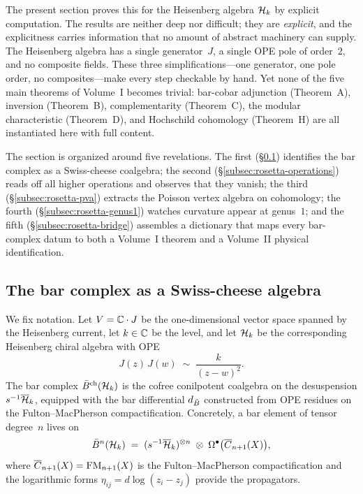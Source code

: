 The present section proves this for the Heisenberg algebra
$\mathcal{H}_k$ by explicit computation.  The results are neither deep
nor difficult; they are \emph{explicit}, and the explicitness
carries information that no amount of abstract machinery can supply.
The Heisenberg algebra has a single generator~$J$, a single
OPE pole of order~$2$, and no composite fields.  These three
simplifications---one generator, one pole order, no composites---make
every step checkable by hand.  Yet none of the five main theorems
of Volume~I becomes trivial: bar-cobar adjunction (Theorem~A),
inversion (Theorem~B), complementarity (Theorem~C), the modular
characteristic (Theorem~D), and Hochschild cohomology (Theorem~H)
are all instantiated here with full content.

The section is organized around five revelations.  The first
(\S\ref{subsec:rosetta-swiss-cheese}) identifies the bar complex
as a Swiss-cheese coalgebra; the second
(\S\ref{subsec:rosetta-operations}) reads off all higher operations
and observes that they vanish; the third
(\S\ref{subsec:rosetta-pva}) extracts the Poisson vertex algebra
on cohomology; the fourth (\S\ref{subsec:rosetta-genus1}) watches
curvature appear at genus~$1$; and the fifth
(\S\ref{subsec:rosetta-bridge}) assembles a dictionary that
maps every bar-complex datum to both a Volume~I theorem and a
Volume~II physical identification.


\subsection{The bar complex as a Swiss-cheese algebra}
\label{subsec:rosetta-swiss-cheese}

We fix notation.  Let $V = \mathbb{C} \cdot J$ be the one-dimensional
vector space spanned by the Heisenberg current, let $k \in \mathbb{C}$
be the level, and let $\mathcal{H}_k$ be the corresponding Heisenberg
chiral algebra with OPE
\begin{equation}\label{eq:rosetta-heisenberg-ope}
J(z)\, J(w) \;\sim\; \frac{k}{(z - w)^2}.
\end{equation}
The bar complex $\bar{B}^{\mathrm{ch}}(\mathcal{H}_k)$ is the cofree
conilpotent coalgebra on the desuspension $s^{-1}\overline{\mathcal{H}}_k$,
equipped with the bar differential $d_{\bar{B}}$ constructed from
OPE residues on the Fulton--MacPherson compactification.
Concretely, a bar element of tensor degree~$n$ lives on
\begin{equation}\label{eq:rosetta-bar-element-space}
\bar{B}^n(\mathcal{H}_k) \;=\;
(s^{-1}\overline{\mathcal{H}}_k)^{\otimes n}
\;\otimes\;
\Omega^{\bullet}\bigl(\overline{C}_{n+1}(X)\bigr),
\end{equation}
where $\overline{C}_{n+1}(X) = \mathrm{FM}_{n+1}(X)$ is the
Fulton--MacPherson compactification and the logarithmic forms
$\eta_{ij} = d\log(z_i - z_j)$ provide the propagators.

